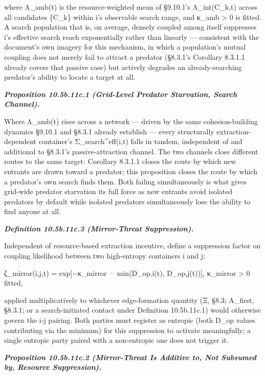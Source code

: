 \documentclass[
]{article}
\begin{document}
where Λ\_amb(t) is the resource-weighted mean of §9.10.1's
Λ\_int(C\_k,t) across all candidates \{C\_k\} within i's observable
search range, and κ\_amb \textgreater{} 0 is fitted. A search population
that is, on average, densely coupled among itself suppresses i's
effective search reach exponentially rather than linearly --- consistent
with the document's own imagery for this mechanism, in which a
population's mutual coupling does not merely fail to attract a predator
(§8.3.1's Corollary 8.3.1.1 already covers that passive case) but
actively degrades an already-searching predator's ability to locate a
target at all.

\emph{\textbf{Proposition 10.5b.11c.1 (Grid-Level Predator Starvation,
Search Channel).}}

Where Λ\_amb(t) rises across a network --- driven by the same
cohesion-building dynamics §9.10.1 and §8.3.1 already establish ---
every structurally extraction-dependent container's
Σ\_search\^{}eff(i,t) falls in tandem, independent of and additional to
§8.3.1's passive-attraction channel. The two channels close different
routes to the same target: Corollary 8.3.1.1 closes the route by which
new entrants are drawn toward a predator; this proposition closes the
route by which a predator's own search finds them. Both failing
simultaneously is what gives grid-wide predator starvation its full
force as new entrants avoid isolated predators by default while isolated
predators simultaneously lose the ability to find anyone at all.

\emph{\textbf{Definition 10.5b.11c.3 (Mirror-Threat Suppression).}}

Independent of resource-based extraction incentive, define a suppression
factor on coupling likelihood between two high-entropy containers i and
j:

ζ\_mirror(i,j,t) = exp{[}−κ\_mirror · min(D\_op,i(t), D\_op,j(t)){]},
κ\_mirror \textgreater{} 0 fitted,

applied multiplicatively to whichever edge-formation quantity (Ξ, §8.3;
A\_first, §8.3.1; or a search-initiated contact under Definition
10.5b.11c.1) would otherwise govern the i-j pairing. Both parties must
register as entropic (both D\_op values contributing via the minimum)
for this suppression to activate meaningfully; a single entropic party
paired with a non-entropic one does not trigger it.

\emph{\textbf{Proposition 10.5b.11c.2 (Mirror-Threat Is Additive to, Not
Subsumed by, Resource Suppression).}}
\end{document}
